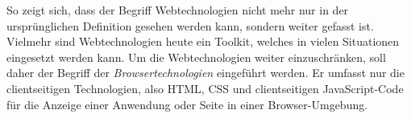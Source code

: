 So zeigt sich, dass der Begriff Webtechnologien nicht mehr nur in der ursprünglichen Definition gesehen werden kann,
sondern weiter gefasst ist. Vielmehr sind Webtechnologien heute ein Toolkit, welches in vielen Situationen eingesetzt werden
kann. Um die Webtechnologien weiter einzuschränken, soll daher der Begriff der \emph{Browsertechnologien} eingeführt werden. 
Er umfasst nur die clientseitigen Technologien, also HTML, CSS und clientseitigen JavaScript-Code 
für die Anzeige einer Anwendung oder Seite in einer Browser-Umgebung.

